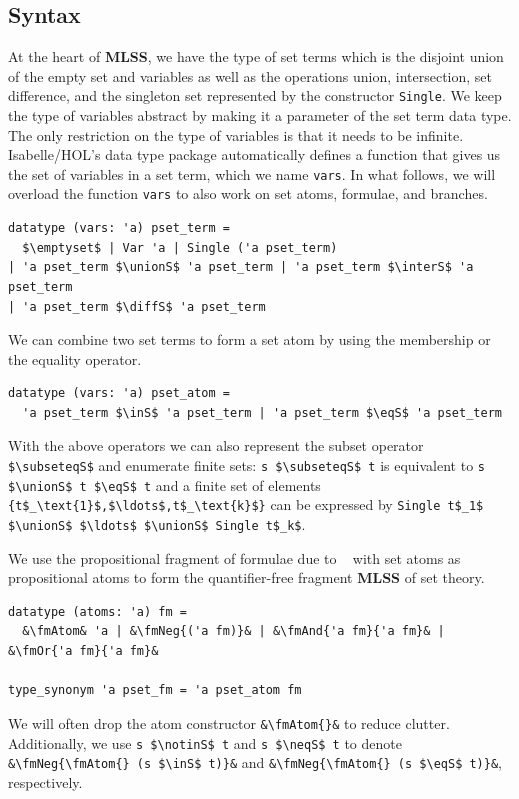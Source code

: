 \documentclass[runningheads]{llncs}
\newcommand{\MLSS}{\textbf{MLSS}}
\newcommand{\unionS}{\sqcup_\text{s}}
\newcommand{\interS}{\sqcap_\text{s}}
\newcommand{\diffS}{-_\text{s}}
\newcommand{\inS}{\in_\text{s}}
\newcommand{\notinS}{\notin_\text{s}}
\newcommand{\eqS}{=_\text{s}}
\newcommand{\neqS}{\neq_\text{s}}
\newcommand{\subseteqS}{\sqsubseteq_\text{s}}
\newcommand{\fmAndSymbol}{\boldsymbol{\land}}
\newcommand{\fmAnd}[2]{#1 $\fmAndSymbol$ #2}
\newcommand{\fmOr}[2]{#1 $\boldsymbol{\lor}$ #2}
\newcommand{\fmNegSymbol}{\boldsymbol{\neg}}
\newcommand{\fmNeg}[1]{$\fmNegSymbol\:$#1}
\newcommand{\fmAtom}{\textbf{A}}
\begin{document}
\subsection{Syntax}
At the heart of \MLSS{}, we have the type of set terms which is the disjoint union of the empty set and variables as well as the operations union, intersection, set difference, and the singleton set represented by the constructor \lstinline!Single!.
We keep the type of variables abstract by making it a parameter of the set term data type.
The only restriction on the type of variables is that it needs to be infinite.
Isabelle/HOL's data type package automatically defines a function that gives us the set of variables in a set term, which we name \lstinline!vars!.
In what follows, we will overload the function \lstinline!vars! to also work on set atoms, formulae, and branches.
\begin{lstlisting}
datatype (vars: 'a) pset_term =
  $\emptyset$ | Var 'a | Single ('a pset_term)
| 'a pset_term $\unionS$ 'a pset_term | 'a pset_term $\interS$ 'a pset_term
| 'a pset_term $\diffS$ 'a pset_term
\end{lstlisting}
We can combine two set terms to form a set atom by using the membership or the equality operator.
\begin{lstlisting}
datatype (vars: 'a) pset_atom =
  'a pset_term $\inS$ 'a pset_term | 'a pset_term $\eqS$ 'a pset_term
\end{lstlisting}
With the above operators we can also represent the subset operator \lstinline!$\subseteqS$! and enumerate finite sets: \lstinline!s $\subseteqS$ t! is equivalent to \lstinline!s $\unionS$ t $\eqS$ t! and a finite set of elements \lstinline!{t$_\text{1}$,$\ldots$,t$_\text{k}$}! can be expressed by \lstinline!Single t$_1$ $\unionS$ $\ldots$ $\unionS$ Single t$_k$!.

We use the propositional fragment of formulae due to \citeauthor{lqe}~\cite{lqe} with set atoms as propositional atoms to form the quantifier-free fragment \MLSS{} of set theory.
\begin{lstlisting}
datatype (atoms: 'a) fm =
  &\fmAtom& 'a | &\fmNeg{('a fm)}& | &\fmAnd{'a fm}{'a fm}& | &\fmOr{'a fm}{'a fm}&

type_synonym 'a pset_fm = 'a pset_atom fm
\end{lstlisting}
We will often drop the atom constructor \lstinline!&\fmAtom{}&! to reduce clutter.
Additionally, we use \lstinline!s $\notinS$ t! and \lstinline!s $\neqS$ t! to denote \lstinline!&\fmNeg{\fmAtom{} (s $\inS$ t)}&! and \lstinline!&\fmNeg{\fmAtom{} (s $\eqS$ t)}&!, respectively.
\end{document}
